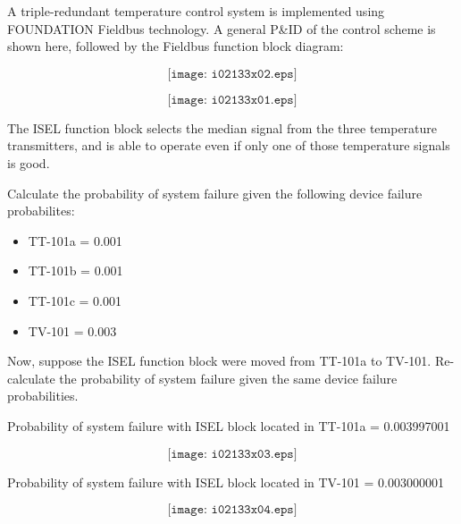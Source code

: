 

A triple-redundant temperature control system is implemented using FOUNDATION Fieldbus technology.  A general P\&ID of the control scheme is shown here, followed by the Fieldbus function block diagram:

$$\texttt{[image: i02133x02.eps]}$$

$$\texttt{[image: i02133x01.eps]}$$

The ISEL function block selects the median signal from the three temperature transmitters, and is able to operate even if only one of those temperature signals is good.

\filbreak

Calculate the probability of system failure given the following device failure probabilites:

\begin{itemize}
\item{} TT-101a = 0.001
\item{} TT-101b = 0.001
\item{} TT-101c = 0.001
\item{} TV-101 = 0.003
\end{itemize}

\vskip 10pt

Now, suppose the ISEL function block were moved from TT-101a to TV-101.  Re-calculate the probability of system failure given the same device failure probabilities.







Probability of system failure with ISEL block located in TT-101a = 0.003997001

$$\texttt{[image: i02133x03.eps]}$$

\vskip 20pt

Probability of system failure with ISEL block located in TV-101 = 0.003000001

$$\texttt{[image: i02133x04.eps]}$$











